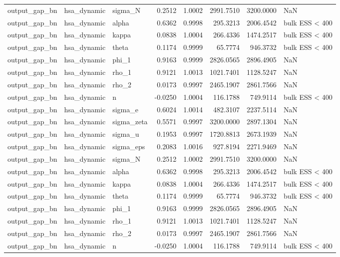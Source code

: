 \begin{tabular}{lllrrrrl}
output\_gap\_bn & hsa\_dynamic & sigma\_N & 0.2512 & 1.0002 & 2991.7510 & 3200.0000 & NaN \\
output\_gap\_bn & hsa\_dynamic & alpha & 0.6362 & 0.9998 & 295.3213 & 2006.4542 & bulk ESS < 400 \\
output\_gap\_bn & hsa\_dynamic & kappa & 0.0838 & 1.0004 & 266.4336 & 1474.2517 & bulk ESS < 400 \\
output\_gap\_bn & hsa\_dynamic & theta & 0.1174 & 0.9999 & 65.7774 & 946.3732 & bulk ESS < 400 \\
output\_gap\_bn & hsa\_dynamic & phi\_1 & 0.9163 & 0.9999 & 2826.0565 & 2896.4905 & NaN \\
output\_gap\_bn & hsa\_dynamic & rho\_1 & 0.9121 & 1.0013 & 1021.7401 & 1128.5247 & NaN \\
output\_gap\_bn & hsa\_dynamic & rho\_2 & 0.0173 & 0.9997 & 2465.1907 & 2861.7566 & NaN \\
output\_gap\_bn & hsa\_dynamic & n & -0.0250 & 1.0004 & 116.1788 & 749.9114 & bulk ESS < 400 \\
output\_gap\_bn & hsa\_dynamic & sigma\_e & 0.6024 & 1.0014 & 482.3107 & 2237.5114 & NaN \\
output\_gap\_bn & hsa\_dynamic & sigma\_zeta & 0.5571 & 0.9997 & 3200.0000 & 2897.1304 & NaN \\
output\_gap\_bn & hsa\_dynamic & sigma\_u & 0.1953 & 0.9997 & 1720.8813 & 2673.1939 & NaN \\
output\_gap\_bn & hsa\_dynamic & sigma\_eps & 0.2083 & 1.0016 & 927.8194 & 2271.9469 & NaN \\
output\_gap\_bn & hsa\_dynamic & sigma\_N & 0.2512 & 1.0002 & 2991.7510 & 3200.0000 & NaN \\
output\_gap\_bn & hsa\_dynamic & alpha & 0.6362 & 0.9998 & 295.3213 & 2006.4542 & bulk ESS < 400 \\
output\_gap\_bn & hsa\_dynamic & kappa & 0.0838 & 1.0004 & 266.4336 & 1474.2517 & bulk ESS < 400 \\
output\_gap\_bn & hsa\_dynamic & theta & 0.1174 & 0.9999 & 65.7774 & 946.3732 & bulk ESS < 400 \\
output\_gap\_bn & hsa\_dynamic & phi\_1 & 0.9163 & 0.9999 & 2826.0565 & 2896.4905 & NaN \\
output\_gap\_bn & hsa\_dynamic & rho\_1 & 0.9121 & 1.0013 & 1021.7401 & 1128.5247 & NaN \\
output\_gap\_bn & hsa\_dynamic & rho\_2 & 0.0173 & 0.9997 & 2465.1907 & 2861.7566 & NaN \\
output\_gap\_bn & hsa\_dynamic & n & -0.0250 & 1.0004 & 116.1788 & 749.9114 & bulk ESS < 400 \\

\end{tabular}
